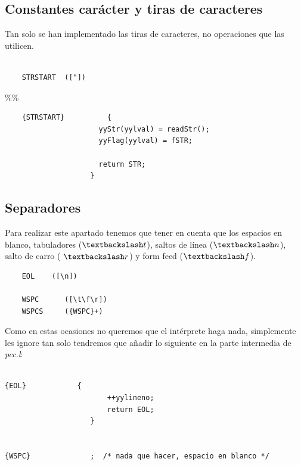 \documentclass[11pt]{article}
\begin{document}
\subsection{Constantes carácter y tiras de caracteres}

\noindent Tan solo se han implementado las tiras de caracteres, no operaciones que las utilicen.

\begin{verbatim}

    STRSTART  (["])

\end{verbatim}

\%\%
\begin{verbatim}
    {STRSTART}          {
                      yyStr(yylval) = readStr();
                      yyFlag(yylval) = fSTR;

                      return STR;
                    }
\end{verbatim}


\subsection{Separadores}

\noindent Para realizar este apartado tenemos que tener en cuenta que los espacios en blanco, tabuladores (\textit{$\textbackslash t$}), saltos de línea (\textit{$\textbackslash n$}), salto de carro (\textit{ $\textbackslash r$}) y form feed (\textit{$\textbackslash f$}).

\begin{verbatim}
    EOL    ([\n])
    
    WSPC      ([\t\f\r])
    WSPCS     ({WSPC}+)

\end{verbatim}

\newpage

\noindent Como en estas ocasiones no queremos que el intérprete haga nada, simplemente les ignore tan solo tendremos que añadir lo siguiente en la parte intermedia de \textit{pcc.l}:

\begin{verbatim}

{EOL}            {
                        ++yylineno;
                        return EOL;
                    }


{WSPC}              ;  /* nada que hacer, espacio en blanco */


\end{verbatim}
\end{document}
